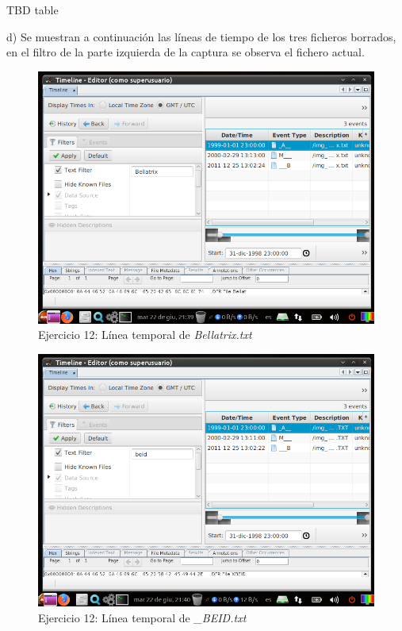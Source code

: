 \documentclass[11pt]{article}
\begin{document}
TBD table

d) Se muestran a continuación las líneas de tiempo de los tres ficheros borrados, en el filtro de la parte izquierda de la captura se observa el fichero actual.

\begin{figure}[H]
    \caption{Ejercicio 12: Línea temporal de \textit{Bellatrix.txt}}
    \centering
    \includegraphics[scale=0.7]{e12-8.png}
\end{figure}

\begin{figure}[H]
    \caption{Ejercicio 12: Línea temporal de \textit{\_BEID.txt}}
    \centering
    \includegraphics[scale=0.7]{e12-9.png}
\end{figure}
\end{document}
